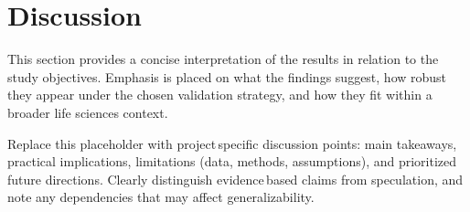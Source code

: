 \section{Discussion}

\noindent This section provides a concise interpretation of the results in relation to the study objectives. Emphasis is placed on what the findings suggest, how robust they appear under the chosen validation strategy, and how they fit within a broader life sciences context.

\noindent Replace this placeholder with project\,specific discussion points: main takeaways, practical implications, limitations (data, methods, assumptions), and prioritized future directions. Clearly distinguish evidence\,based claims from speculation, and note any dependencies that may affect generalizability.